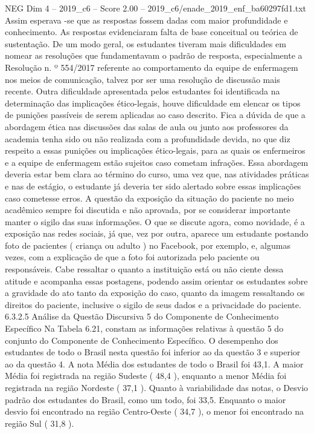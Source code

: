 \begin{textsample}{NEG Dim 4 – 2019\_c6 – Score 2.00 – 2019\_c6/enade\_2019\_enf\_ba60297fd1.txt}
Assim esperava -se que as respostas fossem dadas com maior profundidade e conhecimento.
As respostas evidenciaram falta de base conceitual ou teórica de sustentação.
De um modo geral, os estudantes tiveram mais dificuldades em nomear as resoluções que fundamentavam o padrão de resposta, especialmente a Resolução n. º 554/2017 referente ao comportamento da equipe de enfermagem nos meios de comunicação, talvez por ser uma resolução de discussão mais recente.
Outra dificuldade apresentada pelos estudantes foi identificada na determinação das implicações ético-legais, houve dificuldade em elencar os tipos de punições passíveis de serem aplicadas ao caso descrito.
Fica a dúvida de que a abordagem ética nas discussões das salas de aula ou junto aos professores da academia tenha sido ou não realizada com a profundidade devida, no que diz respeito a essas punições ou implicações ético-legais, para as quais os enfermeiros e a equipe de enfermagem estão sujeitos caso cometam infrações.
Essa abordagem deveria estar bem clara ao término do curso, uma vez que, nas atividades práticas e nas de estágio, o estudante já deveria ter sido alertado sobre essas implicações caso cometesse erros.
A questão da exposição da situação do paciente no meio acadêmico sempre foi discutida e não aprovada, por se considerar importante manter o sigilo das suas informações.
O que se discute agora, como novidade, é a exposição nas redes sociais, já que, vez por outra, aparece um estudante postando foto de pacientes ( criança ou adulto ) no Facebook, por exemplo, e, algumas vezes, com a explicação de que a foto foi autorizada pelo paciente ou responsáveis.
Cabe ressaltar o quanto a instituição está ou não ciente dessa atitude e acompanha essas postagens, podendo assim orientar os estudantes sobre a gravidade do ato tanto da exposição do caso, quanto da imagem ressaltando os direitos do paciente, inclusive o sigilo de seus dados e a privacidade do paciente. 6.3.2.5 Análise da Questão Discursiva 5 do Componente de Conhecimento Específico Na Tabela 6.21, constam as informações relativas à questão 5 do conjunto do Componente de Conhecimento Específico.
O desempenho dos estudantes de todo o Brasil nesta questão foi inferior ao da questão 3 e superior ao da questão 4.
A nota Média dos estudantes de todo o Brasil foi 43,1.
A maior Média foi registrada na região Sudeste ( 48,4 ), enquanto a menor Média foi registrada na região Nordeste ( 37,1 ).
Quanto à variabilidade das notas, o Desvio padrão dos estudantes do Brasil, como um todo, foi 33,5.
Enquanto o maior desvio foi encontrado na região Centro-Oeste ( 34,7 ), o menor foi encontrado na região Sul ( 31,8 ).

\end{textsample}
